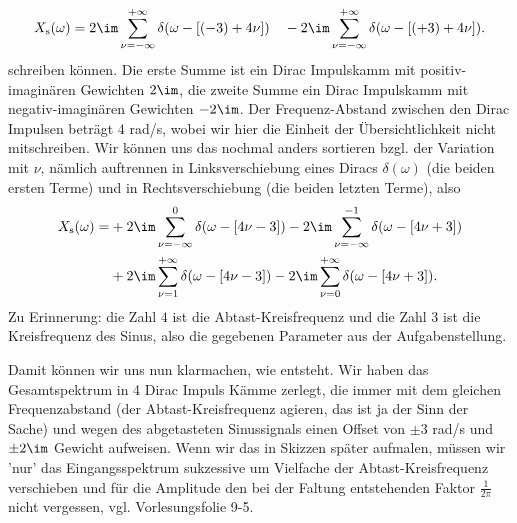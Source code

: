 \begin{ExCalc}
\begin{equation}
X_\mathrm{s}(\omega) = 2\im
\sum_{\nu=-\infty}^{+\infty} \delta(\omega - [(-3)+4\nu])
\quad-
2\im
\sum_{\nu=-\infty}^{+\infty} \delta(\omega - [(+3)+4\nu]).
\end{equation}
schreiben können.
Die erste Summe ist ein Dirac Impulskamm mit positiv-imaginären Gewichten $2\im$, die
zweite Summe ein Dirac Impulskamm mit negativ-imaginären Gewichten $-2\im$. Der Frequenz-Abstand zwischen
den Dirac Impulsen beträgt $4$ rad/s, wobei wir hier die Einheit der
Übersichtlichkeit nicht mitschreiben.
%
Wir können uns das nochmal anders sortieren bzgl. der Variation mit $\nu$,
nämlich auftrennen in Linksverschiebung eines Diracs $\delta(\omega)$
(die beiden ersten Terme) und in Rechtsverschiebung
(die beiden letzten Terme), also
\begin{align}
X_\mathrm{s}(\omega) =
&+2\im\sum_{\nu=-\infty}^{0} \delta(\omega - [4\nu-3])
-2\im\sum_{\nu=-\infty}^{-1} \delta(\omega - [4\nu+3])\\
&+2\im\sum_{\nu=1}^{+\infty} \delta(\omega - [4\nu-3])
-2\im\sum_{\nu=0}^{+\infty} \delta(\omega - [4\nu+3]).
\end{align}
Zu Erinnerung: die Zahl $4$ ist die Abtast-Kreisfrequenz und die Zahl $3$
ist die Kreisfrequenz des Sinus, also die gegebenen Parameter aus der Aufgabenstellung.

Damit können wir uns nun klarmachen, wie
 entsteht. Wir haben das Gesamtspektrum
in 4 Dirac Impuls Kämme zerlegt, die immer mit dem gleichen Frequenzabstand
(der Abtast-Kreisfrequenz agieren, das ist ja der Sinn der Sache) und wegen
des abgetasteten Sinussignals einen Offset von $\pm 3$ rad/s und $\pm 2\im$ Gewicht
aufweisen.
Wenn wir das in Skizzen später aufmalen, müssen wir 'nur' das Eingangsspektrum
sukzessive um Vielfache der Abtast-Kreisfrequenz verschieben und für die Amplitude
den bei der Faltung entstehenden Faktor $\frac{1}{2\pi}$ nicht vergessen, vgl.
Vorlesungsfolie 9-5.
\end{ExCalc}
